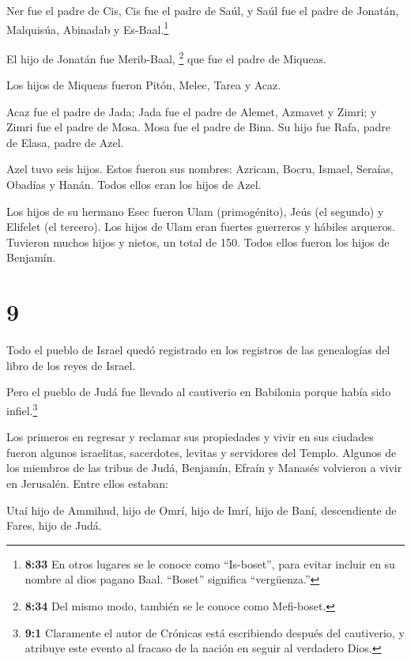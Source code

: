  Ner fue el padre de Cis, Cis fue el padre de Saúl, y Saúl
fue el padre de Jonatán, Malquisúa, Abinadab y Es-Baal.\footnote{\textbf{8:33}
  En otros lugares se le conoce como ``Is-boset'', para evitar incluir
  en su nombre al dios pagano Baal. ``Boset'' significa ``vergüenza.''}

 El hijo de Jonatán fue Merib-Baal, \footnote{\textbf{8:34}
  Del mismo modo, también se le conoce como Mefi-boset.} que fue el
padre de Miqueas.

 Los hijos de Miqueas fueron Pitón, Melec, Tarea y Acaz.

 Acaz fue el padre de Jada; Jada fue el padre de Alemet,
Azmavet y Zimri; y Zimri fue el padre de Mosa.  Mosa fue el
padre de Bina. Su hijo fue Rafa, padre de Elasa, padre de Azel.

 Azel tuvo seis hijos. Estos fueron sus nombres: Azricam,
Bocru, Ismael, Seraías, Obadías y Hanán. Todos ellos eran los hijos de
Azel.

 Los hijos de su hermano Esec fueron Ulam (primogénito),
Jeús (el segundo) y Elifelet (el tercero).  Los hijos de
Ulam eran fuertes guerreros y hábiles arqueros. Tuvieron muchos hijos y
nietos, un total de 150. Todos ellos fueron los hijos de Benjamín.

\hypertarget{section-8}{%
\section{9}\label{section-8}}

 Todo el pueblo de Israel quedó registrado en los registros
de las genealogías del libro de los reyes de Israel.

Pero el pueblo de Judá fue llevado al cautiverio en Babilonia porque
había sido infiel.\footnote{\textbf{9:1} Claramente el autor de Crónicas
  está escribiendo después del cautiverio, y atribuye este evento al
  fracaso de la nación en seguir al verdadero Dios.}

 Los primeros en regresar y reclamar sus propiedades y vivir
en sus ciudades fueron algunos israelitas, sacerdotes, levitas y
servidores del Templo.  Algunos de los miembros de las
tribus de Judá, Benjamín, Efraín y Manasés volvieron a vivir en
Jerusalén. Entre ellos estaban:

 Utaí hijo de Ammihud, hijo de Omrí, hijo de Imrí, hijo de
Baní, descendiente de Fares, hijo de Judá.

